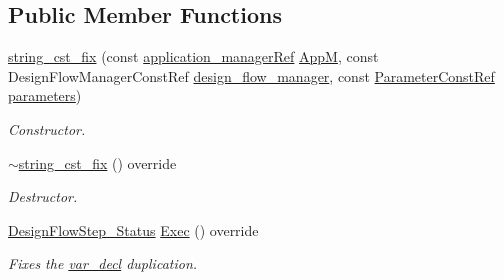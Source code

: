 \subsection*{Public Member Functions}
\begin{DoxyCompactItemize}
\item 
\hyperlink{classstring__cst__fix_a361651f7fd62a70ec7f9add6cb687a4c}{string\+\_\+cst\+\_\+fix} (const \hyperlink{application__manager_8hpp_a04ccad4e5ee401e8934306672082c180}{application\+\_\+manager\+Ref} \hyperlink{classFrontendFlowStep_a0ac0d8db2a378416583f51c4faa59d15}{AppM}, const Design\+Flow\+Manager\+Const\+Ref \hyperlink{classDesignFlowStep_ab770677ddf087613add30024e16a5554}{design\+\_\+flow\+\_\+manager}, const \hyperlink{Parameter_8hpp_a37841774a6fcb479b597fdf8955eb4ea}{Parameter\+Const\+Ref} \hyperlink{classDesignFlowStep_a802eaafe8013df706370679d1a436949}{parameters})
\begin{DoxyCompactList}\small\item\em Constructor. \end{DoxyCompactList}\item 
\hyperlink{classstring__cst__fix_ae2a9b955dae6cb7478c80f2326a638f2}{$\sim$string\+\_\+cst\+\_\+fix} () override
\begin{DoxyCompactList}\small\item\em Destructor. \end{DoxyCompactList}\item 
\hyperlink{design__flow__step_8hpp_afb1f0d73069c26076b8d31dbc8ebecdf}{Design\+Flow\+Step\+\_\+\+Status} \hyperlink{classstring__cst__fix_a366deb5000664520f5b7979a5ecb48bc}{Exec} () override
\begin{DoxyCompactList}\small\item\em Fixes the \hyperlink{structvar__decl}{var\+\_\+decl} duplication. \end{DoxyCompactList}\end{DoxyCompactItemize}
